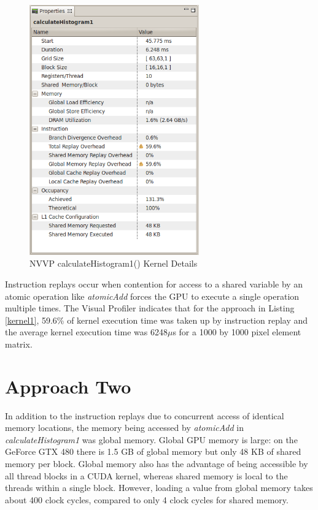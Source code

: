 \documentclass{article}
\begin{document}
\begin{figure}
\centering
\includegraphics[width=0.65\textwidth]{screenshots/nvvp/calculateHistogram1_screen3.png}
\caption{NVVP calculateHistogram1() Kernel Details}
\label{kernel1nvvp3}
\end{figure}

Instruction replays occur when contention for access to a shared variable by an atomic operation like \emph{atomicAdd} forces the GPU to execute a single operation multiple times. The Visual Profiler indicates that for the approach in Listing \ref{kernel1}, 59.6\% of kernel execution time was taken up by instruction replay and the average kernel execution time was 6248$\mu$s for a 1000 by 1000 pixel element matrix.

\section{Approach Two}\label{approach2}

In addition to the instruction replays due to concurrent access of identical memory locations, the memory being accessed by \emph{atomicAdd} in \emph{calculateHistogram1} was global memory. Global GPU memory is large: on the GeForce GTX 480 there is 1.5 GB of global memory but only 48 KB of shared memory per block\cite{geforce480}. Global memory also has the advantage of being accessible by all thread blocks in a CUDA kernel, whereas shared memory is local to the threads within a single block. However, loading a value from global memory takes about 400 clock cycles, compared to only 4 clock cycles for shared memory\cite{shared-memory}.
\end{document}
